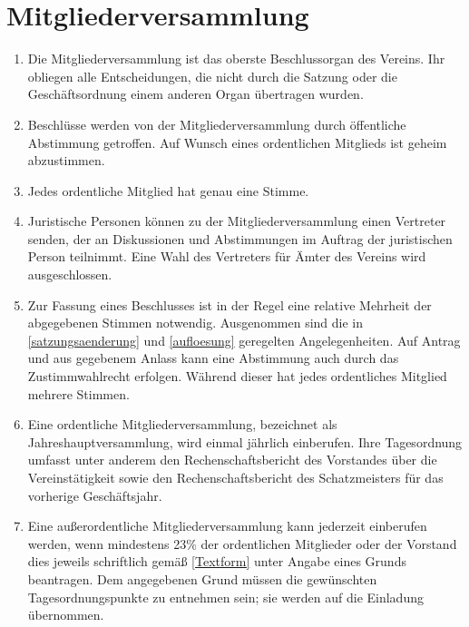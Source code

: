 \documentclass[fontsize=12pt,paper=a4,pagesize,headings=small]{scrartcl}
\begin{document}
\section{Mitgliederversammlung}

\begin{enumerate}
    \item Die Mitgliederversammlung ist das oberste Beschlussorgan des
    Vereins. Ihr obliegen alle Entscheidungen, die nicht durch die
    Satzung oder die Geschäftsordnung einem anderen Organ übertragen
    wurden.

    \item Beschlüsse werden von der Mitgliederversammlung durch
    öffentliche Abstimmung getroffen. Auf Wunsch eines ordentlichen
    Mitglieds ist geheim abzustimmen.

    \item Jedes ordentliche Mitglied hat genau eine Stimme.

    \item Juristische Personen können zu der Mitgliederversammlung
    einen Vertreter senden, der an Diskussionen und Abstimmungen im
    Auftrag der juristischen Person teilnimmt. Eine Wahl des Vertreters
    für Ämter des Vereins wird ausgeschlossen.

    \item Zur Fassung eines Beschlusses ist in der Regel eine relative
    Mehrheit der abgegebenen Stimmen notwendig. Ausgenommen sind die in
    \ref{satzungsaenderung} und \ref{aufloesung} geregelten
    Angelegenheiten. Auf Antrag und aus gegebenem Anlass kann eine
    Abstimmung auch durch das Zustimmwahlrecht erfolgen. Während dieser
    hat jedes ordentliches Mitglied mehrere Stimmen.

    \item Eine ordentliche Mitgliederversammlung, bezeichnet als
    Jahreshauptversammlung, wird einmal jährlich einberufen. Ihre
    Tagesordnung umfasst unter anderem den Rechenschaftsbericht des
    Vorstandes über die Vereinstätigkeit sowie den Rechenschaftsbericht
    des Schatzmeisters für das vorherige Geschäftsjahr.

    \item Eine außerordentliche Mitgliederversammlung kann jederzeit
    einberufen werden, wenn mindestens 23\% der ordentlichen Mitglieder
    oder der Vorstand dies jeweils schriftlich gemäß \ref{Textform}
    unter Angabe eines Grunds beantragen. Dem angegebenen Grund müssen
    die gewünschten Tagesordnungspunkte zu entnehmen sein; sie werden
    auf die Einladung übernommen.


\end{enumerate}
\end{document}
